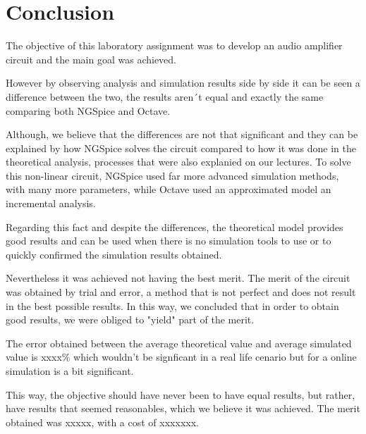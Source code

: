 \newpage
\section{Conclusion}
\label{sec:conclusion}

\par The objective of this laboratory assignment was to develop an audio amplifier circuit and the main goal was achieved. 

\par However by observing analysis and simulation results side by side it can be seen a difference between the two, the results aren´t equal and exactly the same comparing both NGSpice and Octave. 
\par Although, we believe that the differences are not that significant and they can be explained by how NGSpice solves the circuit compared to how it was done in the theoretical analysis, processes that were also explanied on our lectures. To solve this non-linear circuit, NGSpice used far more advanced simulation methods, with many more parameters, while Octave used an approximated model an incremental analysis. 
\par Regarding this fact and despite the differences, the theoretical model provides good results and can be used when there is no simulation tools to use or to quickly confirmed the simulation results obtained.

\par Nevertheless it was achieved not having the best merit. The merit of the circuit was obtained by trial and error, a method that is not perfect and does not result in the best possible results. In this way, we concluded that in order to obtain good results, we were obliged to "yield" part of the merit.

\par The error obtained between the average theoretical value and average simulated value is xxxx\% which wouldn't be signficant in a real life cenario but for a online simulation is a bit significant.

\par This way, the objective should have never been to have equal results, but rather, have results that seemed reasonables, which we believe it was achieved. The merit obtained was xxxxx, with a cost of xxxxxxx.



